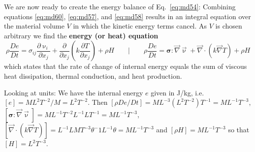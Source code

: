 We are now ready to create the energy balance of Eq.~\eqref{eq:md54}:
Combining equations \eqref{eq:md60}, \eqref{eq:md57}, and
\eqref{eq:md58} results in an integral equation over the material volume $V$ in which the kinetic
energy terms cancel. As $V$ is chosen arbitrary we find the {\bf energy (or heat) equation}
\begin{equation}
\rho \frac{De}{Dt} = \sigma_{ij} \frac{\partial \upnu_i}{\partial x_j} + 
\frac{\partial }{\partial x_j} \left(k \frac{\partial T}{\partial x_j}\right) 
+ \rho H
\qquad
\bigg\rvert
\qquad
\rho \frac{De}{Dt} = {\bm \sigma}: \vec\nabla \vec\upnu
+\vec\nabla \cdot (k \vec\nabla T) + \rho H
\label{eq:md61}
\end{equation}
which states that the rate of change of internal energy equals the sum of viscous heat
dissipation, thermal conduction, and heat production.

\begin{remark}
Looking at units:
We have the internal energy $e$ given in J/kg, i.e. $[e]=ML^2T^{-2}/M=L^2T^{-2}$.
Then $[\rho De/Dt]= ML^{-3}(L^2T^{-2})T^{-1} = M L^{-1} T^{-3}$,
$[{\bm \sigma}: \vec\nabla \vec\upnu] = ML^{-1}T^{-2}  L^{-1} LT^{-1}=ML^{-1} T^{-3}$,
$[\vec\nabla \cdot (k \vec\nabla T)]=L^{-1} L M T^{-3} \theta^-1 L^{-1} \theta
= M L^{-1} T^{-3}$ and $[\rho H]= M L^{-1} T^{-3} $ so that $[H]=  L^{2} T^{-3}$.
\end{remark}

